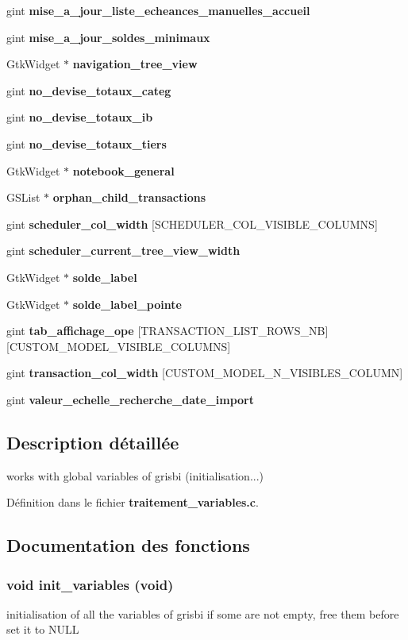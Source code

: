 \begin{DoxyCompactItemize}
\item 
gint {\bf mise\_\-a\_\-jour\_\-liste\_\-echeances\_\-manuelles\_\-accueil}
\item 
gint {\bf mise\_\-a\_\-jour\_\-soldes\_\-minimaux}
\item 
GtkWidget $\ast$ {\bf navigation\_\-tree\_\-view}
\item 
gint {\bf no\_\-devise\_\-totaux\_\-categ}
\item 
gint {\bf no\_\-devise\_\-totaux\_\-ib}
\item 
gint {\bf no\_\-devise\_\-totaux\_\-tiers}
\item 
GtkWidget $\ast$ {\bf notebook\_\-general}
\item 
GSList $\ast$ {\bf orphan\_\-child\_\-transactions}
\item 
gint {\bf scheduler\_\-col\_\-width} [SCHEDULER\_\-COL\_\-VISIBLE\_\-COLUMNS]
\item 
gint {\bf scheduler\_\-current\_\-tree\_\-view\_\-width}
\item 
GtkWidget $\ast$ {\bf solde\_\-label}
\item 
GtkWidget $\ast$ {\bf solde\_\-label\_\-pointe}
\item 
gint {\bf tab\_\-affichage\_\-ope} [TRANSACTION\_\-LIST\_\-ROWS\_\-NB][CUSTOM\_\-MODEL\_\-VISIBLE\_\-COLUMNS]
\item 
gint {\bf transaction\_\-col\_\-width} [CUSTOM\_\-MODEL\_\-N\_\-VISIBLES\_\-COLUMN]
\item 
gint {\bf valeur\_\-echelle\_\-recherche\_\-date\_\-import}
\end{DoxyCompactItemize}


\subsection{Description détaillée}
works with global variables of grisbi (initialisation...) 

Définition dans le fichier {\bf traitement\_\-variables.c}.



\subsection{Documentation des fonctions}
\subsubsection[{init\_\-variables}]{\setlength{\rightskip}{0pt plus 5cm}void init\_\-variables (void)}\label{traitement__variables_8c_a2977fbd2f72d5a8a5da608f804bd2a6f}
initialisation of all the variables of grisbi if some are not empty, free them before set it to NULL



